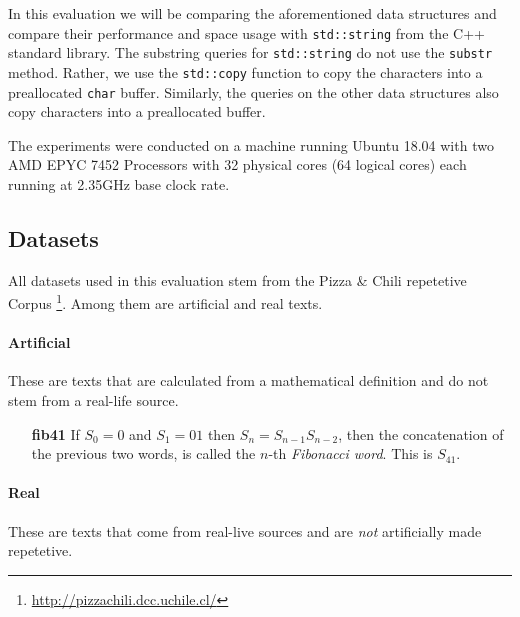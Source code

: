 \documentclass{scrartcl}
\begin{document}
In this evaluation we will be comparing the aforementioned data structures and compare their performance and space usage with \texttt{std::string} from the C++ standard library.
The substring queries for \texttt{std::string} do not use the \texttt{substr} method.
Rather, we use the \texttt{std::copy} function to copy the characters into a preallocated \texttt{char} buffer.
Similarly, the queries on the other data structures also copy characters into a preallocated buffer.

The experiments were conducted on a machine running Ubuntu 18.04 with two AMD EPYC 7452 Processors with 32 physical cores (64 logical cores) each running at 2.35GHz base clock rate.

\subsection{Datasets}

All datasets used in this evaluation stem from the Pizza \& Chili repetetive Corpus \footnote{\url{http://pizzachili.dcc.uchile.cl/}}.
Among them are  artificial and real texts.

\paragraph{Artificial}

These are texts that are calculated from a mathematical definition and do not stem from a real-life source.

\begin{itemize}[leftmargin=2cm]
	\item[\textbf{fib41}] If $S_0 = 0$ and $S_1 = 01$ then $S_n = S_{n-1}S_{n-2}$,
		then the concatenation of the previous two words, is called the $n$-th \emph{Fibonacci word}. \cite{barabash_periodic_2016}
		This is $S_{41}$.
\end{itemize}

\paragraph{Real}

These are texts that come from real-live sources and are \emph{not} artificially made repetetive.
\end{document}
